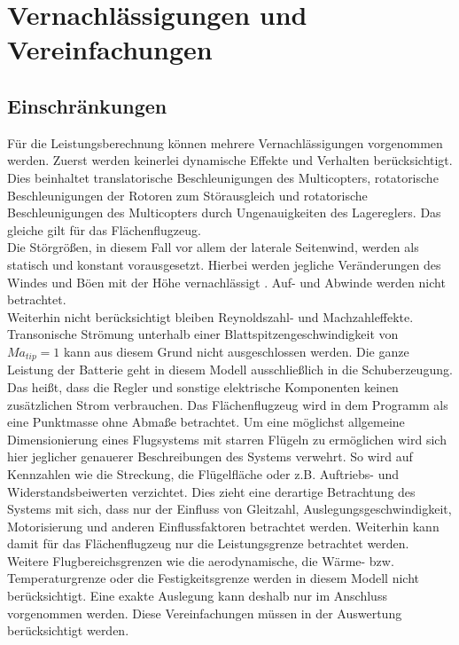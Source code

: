 \section{Vernachlässigungen und Vereinfachungen}
\label{sec:vernachlaessigungen_vereinfachungen}

\subsection{Einschränkungen}
Für die Leistungsberechnung können mehrere Vernachlässigungen vorgenommen werden. Zuerst werden keinerlei dynamische Effekte und Verhalten berücksichtigt. Dies beinhaltet translatorische Beschleunigungen des Multicopters, rotatorische Beschleunigungen der Rotoren zum Störausgleich und rotatorische Beschleunigungen des Multicopters durch Ungenauigkeiten des Lagereglers. Das gleiche gilt für das Flächenflugzeug. \\
Die Störgrößen, in diesem Fall vor allem der laterale Seitenwind, werden als statisch und konstant vorausgesetzt. Hierbei werden jegliche Veränderungen des Windes und Böen mit der Höhe vernachlässigt \cite{Seidel.2011}. Auf- und Abwinde werden nicht betrachtet. \\
Weiterhin nicht berücksichtigt bleiben Reynoldszahl- und Machzahleffekte. Transonische Strömung unterhalb einer Blattspitzengeschwindigkeit von \ensuremath{Ma_{tip}=1} kann aus diesem Grund nicht ausgeschlossen werden.
Die ganze Leistung der Batterie geht in diesem Modell ausschließlich in die Schuberzeugung. Das heißt, dass die Regler und sonstige elektrische Komponenten keinen zusätzlichen Strom verbrauchen.
Das Flächenflugzeug wird in dem Programm als eine Punktmasse ohne Abmaße betrachtet. Um eine möglichst allgemeine Dimensionierung eines Flugsystems mit starren Flügeln zu ermöglichen wird sich hier jeglicher genauerer Beschreibungen des Systems verwehrt. So wird auf Kennzahlen wie die Streckung, die Flügelfläche oder z.B. Auftriebs- und Widerstandsbeiwerten verzichtet. Dies zieht eine derartige Betrachtung des Systems mit sich, dass nur der Einfluss von Gleitzahl, Auslegungsgeschwindigkeit, Motorisierung und anderen Einflussfaktoren betrachtet werden. Weiterhin kann damit für das Flächenflugzeug nur die Leistungsgrenze betrachtet werden. Weitere Flugbereichsgrenzen wie die aerodynamische, die Wärme- bzw. Temperaturgrenze oder die Festigkeitsgrenze werden in diesem Modell nicht berücksichtigt. 
Eine exakte Auslegung kann deshalb nur im Anschluss vorgenommen werden. Diese Vereinfachungen müssen in der Auswertung berücksichtigt werden.


